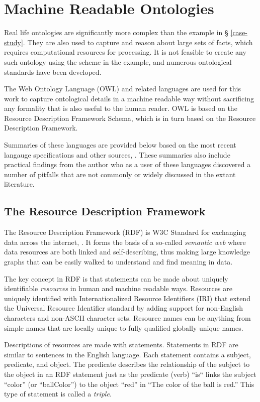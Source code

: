 \section{Machine Readable Ontologies}

Real life ontologies are significantly more complex than the example in \S
\ref{case-study}. They are also used to capture and reason about large sets of
facts, which requires computational resources for processing. It is not feasible
to create any such ontology using the scheme in the example, and numerous
ontological standards have been developed. 

The Web Ontology Language (OWL) and related languages are used for this work to
capture ontological details in a machine readable way without sacrificing any
formality that is also useful to the human reader. OWL is based on the Resource
Description Framework Schema, which is in turn based on the Resource
Description Framework.

Summaries of these languages are provided below based on the most recent
langauge specifications and other sources, \cite{allemang_semantic_2008}. These
summaries also include practical findings from the author who as a user of
these languages discovered a number of pitfalls that are not commonly or widely
discussed in the extant literature.

\subsection{The Resource Description Framework}

The Resource Description Framework (RDF) is  W3C Standard for exchanging data
across the internet, \cite{rdf-w3c,rdf-concepts-syntax}. It forms the basis of a
so-called \textit{semantic web} where data resources are both linked and
self-describing, thus making large knowledge graphs that can be easily walked
to understand and find meaning in data.

The key concept in RDF is that statements can be made about uniquely
identifiable \textit{resources} in human and machine readable ways. Resources
are uniquely identified with Internationalized Resource Identifiers (IRI) that
extend the Universal Resource Identifier standard by adding support for
non-English characters and non-ASCII character sets. Resource names can be
anything from simple names that are locally unique to fully qualified globally
unique names.

Descriptions of resources are made with statements. Statements in RDF are
similar to sentences in the English language. Each statement contains a subject,
predicate, and object. The predicate describes the relationship of the subject
to the object in an RDF statement just as the predicate (verb) ``is`` links the
subject ``color'' (or ``ballColor'') to the object ``red'' in ``The color of
the ball is red.'' This type of statement is called a \textit{triple}.

